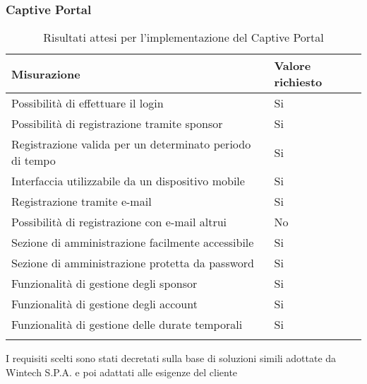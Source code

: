 \documentclass[Tesi.tex]{subfiles}
\begin{document}
\newpage
\subsubsection{Captive Portal}
\label{table:Risultati attesi per l'implementazione del Captive Portal}
\renewcommand*{\arraystretch}{1.2}
\begin{longtable}[H]{p{9.5cm}p{3.4cm}}
	\rowcolor{CHeader}
	\color{CHeaderText} \textbf{Misurazione} & \color{CHeaderText} \textbf{Valore richiesto} \\
	\endhead
	Possibilità di effettuare il login &
	Si \\
	Possibilità di registrazione tramite sponsor &
	Si \\
	Registrazione valida per un determinato periodo di tempo &
	Si \\
	Interfaccia utilizzabile da un dispositivo mobile &
	Si \\
	Registrazione tramite e-mail &
	Si \\
	Possibilità di registrazione con e-mail altrui &
	No \\
	Sezione di amministrazione facilmente accessibile &
	Si \\
	Sezione di amministrazione protetta da password &
	Si \\
	Funzionalità di gestione degli sponsor &
	Si \\
	Funzionalità di gestione degli account &
	Si \\
	Funzionalità di gestione delle durate temporali &
	Si \\
	
	\hiderowcolors
	\caption{Risultati attesi per l'implementazione del Captive Portal}
\end{longtable}
I requisiti scelti sono stati decretati sulla base di soluzioni simili adottate da Wintech S.P.A. e poi adattati alle esigenze del cliente \\
\end{document}
